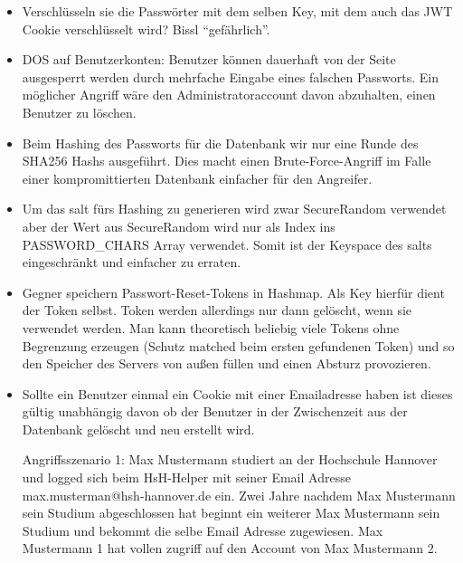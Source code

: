 \documentclass[12pt,DIV14,BCOR10mm,a4paper,parskip=half-,headsepline,headinclude,english,ngerman,bibliography=totocnumbered]{scrreprt}
\begin{document}
\begin{itemize}
  \item Verschlüsseln sie die Passwörter mit dem selben Key, mit dem auch das JWT Cookie verschlüsselt wird? Bissl \enquote{gefährlich}.
  \item DOS auf Benutzerkonten: Benutzer können dauerhaft von der Seite ausgesperrt werden durch mehrfache Eingabe eines falschen Passworts. Ein möglicher Angriff wäre den Administratoraccount davon abzuhalten, einen Benutzer zu löschen.
  \item Beim Hashing des Passworts für die Datenbank wir nur eine Runde des SHA256 Hashs ausgeführt. Dies macht einen Brute-Force-Angriff im Falle einer kompromittierten Datenbank einfacher für den Angreifer.
  \item Um das salt fürs Hashing zu generieren wird zwar SecureRandom verwendet aber der Wert aus SecureRandom wird nur als Index ins PASSWORD\_CHARS Array verwendet. Somit ist der Keyspace des salts eingeschränkt und einfacher zu erraten.
  \item Gegner speichern Passwort-Reset-Tokens in Hashmap. Als Key hierfür dient der Token selbst. Token werden allerdings nur dann gelöscht, wenn sie verwendet werden. Man kann theoretisch beliebig viele Tokens ohne Begrenzung erzeugen (Schutz matched beim ersten gefundenen Token) und so den Speicher des Servers von außen füllen und einen Absturz provozieren.
  
  \item Sollte ein Benutzer einmal ein Cookie mit einer Emailadresse haben ist dieses gültig unabhängig davon ob der Benutzer in der Zwischenzeit aus der Datenbank gelöscht und neu erstellt wird. 

Angriffsszenario 1: Max Mustermann studiert an der Hochschule Hannover und logged sich beim HsH-Helper mit seiner Email Adresse max.musterman@hsh-hannover.de ein. Zwei Jahre nachdem Max Mustermann sein Studium abgeschlossen hat beginnt ein weiterer Max Mustermann sein Studium und bekommt die selbe Email Adresse zugewiesen. Max Mustermann 1 hat vollen zugriff auf den Account von Max Mustermann 2. 


\end{itemize}
\end{document}
